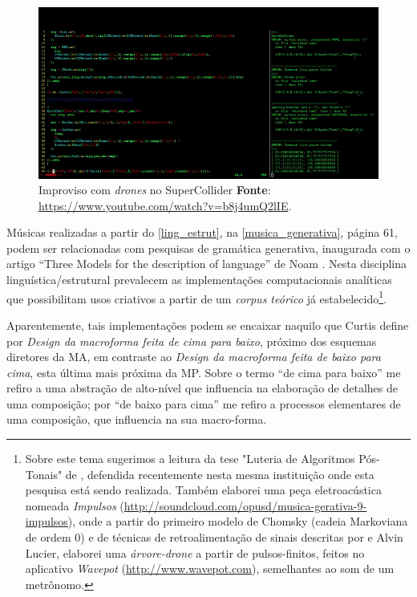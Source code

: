 \begin{figure}
\begin{center}
\includegraphics[scale=0.5]{./imagens/sc_drone.png}
\caption{Improviso com \emph{drones} no SuperCollider \textbf{Fonte}: \url{https://www.youtube.com/watch?v=b8j4umQ2lIE}. }
\label{sc_drone}
\end{center}
\end{figure}

\label{abordagem estrutural}

Músicas realizadas a partir do \autoref{ling_estrut}, na \autoref{musica_generativa}, página 61, podem ser relacionadas com pesquisas de gramática generativa, inaugurada com o artigo ``Three Models for the description of language'' de Noam . Nesta disciplina linguística/estrutural prevalecem as implementações computacionais analíticas que possibilitam usos criativos a partir de um \textit{corpus teórico} já estabelecido\footnote{Sobre este tema sugerimos a leitura da tese "Luteria de Algoritmos Pós-Tonais" de , defendida recentemente nesta mesma instituição onde esta pesquisa está sendo realizada. Também elaborei uma peça eletroacústica nomeada \textit{Impulsos} (\url{http://soundcloud.com/opusd/musica-gerativa-9-impulsos}), onde a partir do primeiro modelo de Chomsky (cadeia Markoviana de ordem 0) e de técnicas de retroalimentação de sinais descritas por  e Alvin Lucier, elaborei uma \textit{árvore-drone} a partir de pulsos-finitos, feitos no aplicativo \emph{Wavepot} (\url{http://www.wavepot.com}), semelhantes ao som de um metrônomo.}.


Aparentemente, tais implementações podem se encaixar naquilo que Curtis  define por \textit{Design da macroforma feita de cima para baixo}, próximo dos esquemas diretores da MA,  em contraste ao \textit{Design da macroforma feita de baixo para cima}, esta última mais próxima da MP. Sobre o termo ``de cima para baixo'' me refiro a uma abstração de alto-nível que influencia na elaboração de detalhes de uma composição; por ``de baixo para cima'' me refiro a processos elementares de uma composição, que influencia na sua macro-forma.

